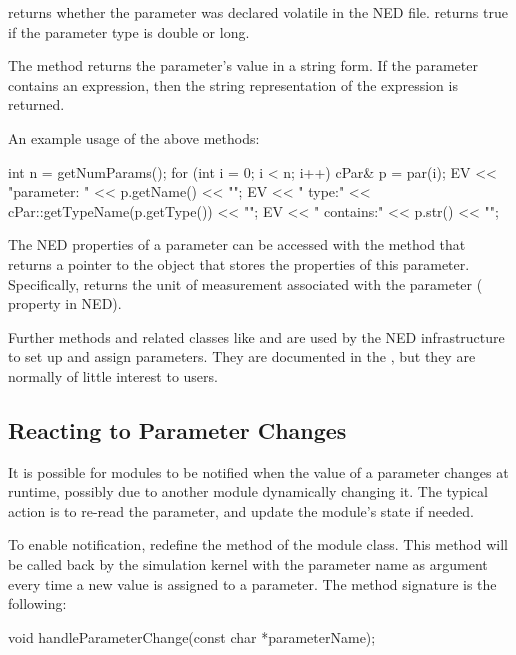 \begin{ned}
 returns whether the parameter was declared volatile
in the NED file.  returns true if the parameter
type is double or long.

The  method returns the parameter's value in a string form.
If the parameter contains an expression, then the string representation
of the expression is returned.

An example usage of the above methods:

\begin{cpp}
int n = getNumParams();
for (int i = 0; i < n; i++)
{
    cPar& p = par(i);
    EV << "parameter: " << p.getName() << "\n";
    EV << "  type:" << cPar::getTypeName(p.getType()) << "\n";
    EV << "  contains:" << p.str() << "\n";
}
\end{cpp}

The NED properties of a parameter can be accessed with the 
method that returns a pointer to the  object that stores
the properties of this parameter. Specifically,  returns
the unit of measurement associated with the parameter ( property in NED).

Further  methods and related classes like  and
 are used by the NED infrastructure to set up and
assign parameters. They are documented in the , but
they are normally of little interest to users.


\subsection{Reacting to Parameter Changes}
\label{sec:simple-modules:handleparameterchange}

It is possible for modules to be notified when the value of a parameter changes
at runtime, possibly due to another module dynamically changing it. The typical
action is to re-read the parameter, and update the module's state if needed.

To enable notification, redefine the  method of
the module class. This method will be called back by the simulation kernel with
the parameter name as argument every time a new value is assigned to a parameter.
The method signature is the following:

\begin{cpp}
void handleParameterChange(const char *parameterName);
\end{cpp}


\end{ned}
